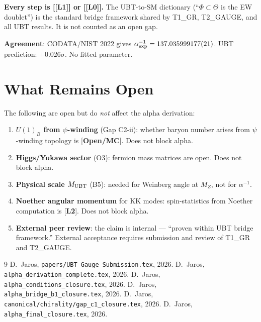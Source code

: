 \documentclass[12pt,a4paper]{article}
\theoremstyle{remark}\newtheorem{remark}[theorem]{Remark}
\newcommand{\Lz}{\textbf{[L0]}}
\newcommand{\Lo}{\textbf{[L1]}}
\begin{document}
\begin{resultbox}
\medskip
\textbf{Every step is [\Lo] or [\Lz].}
The UBT-to-SM dictionary (``$\Phi\subset\Theta$ is the EW doublet'')
is the standard bridge framework shared by T1\_GR, T2\_GAUGE,
and all UBT results. It is not counted as an open gap.

\medskip
\textbf{Agreement}: CODATA/NIST 2022 gives $\alpha^{-1}_{\rm exp}=137.035999177(21)$.
UBT prediction: $+0.026\sigma$. No fitted parameter.
\end{resultbox}

\section{What Remains Open}
\label{sec:open}

\begin{insightbox}
The following are open but do \emph{not} affect the alpha derivation:

\begin{enumerate}
\item \textbf{$U(1)_B$ from $\psi$-winding} (Gap C2-ii): whether baryon
  number arises from $\psi$-winding topology is [\textbf{Open/MC}].
  Does not block alpha.

\item \textbf{Higgs/Yukawa sector} (O3): fermion mass matrices are open.
  Does not block alpha.

\item \textbf{Physical scale $M_{\rm UBT}$} (B5): needed for Weinberg
  angle at $M_Z$, not for $\alpha^{-1}$.

\item \textbf{Noether angular momentum} for KK modes:
  spin-statistics from Noether computation is [\textbf{L2}].
  Does not block alpha.

\item \textbf{External peer review}: the claim is internal ---
  ``proven within UBT bridge framework.'' External acceptance
  requires submission and review of T1\_GR and T2\_GAUGE.
\end{enumerate}
\end{insightbox}

\begin{thebibliography}{9}
  D.~Jaros, \texttt{papers/UBT\_Gauge\_Submission.tex}, 2026.
  D.~Jaros, \texttt{alpha\_derivation\_complete.tex}, 2026.
  D.~Jaros, \texttt{alpha\_conditions\_closure.tex}, 2026.
  D.~Jaros, \texttt{alpha\_bridge\_b1\_closure.tex}, 2026.
  D.~Jaros, \texttt{canonical/chirality/gap\_c1\_closure.tex}, 2026.
  D.~Jaros, \texttt{alpha\_final\_closure.tex}, 2026.
\end{thebibliography}

\ifdefined\INCLUDEMODE\else
\end{document}
